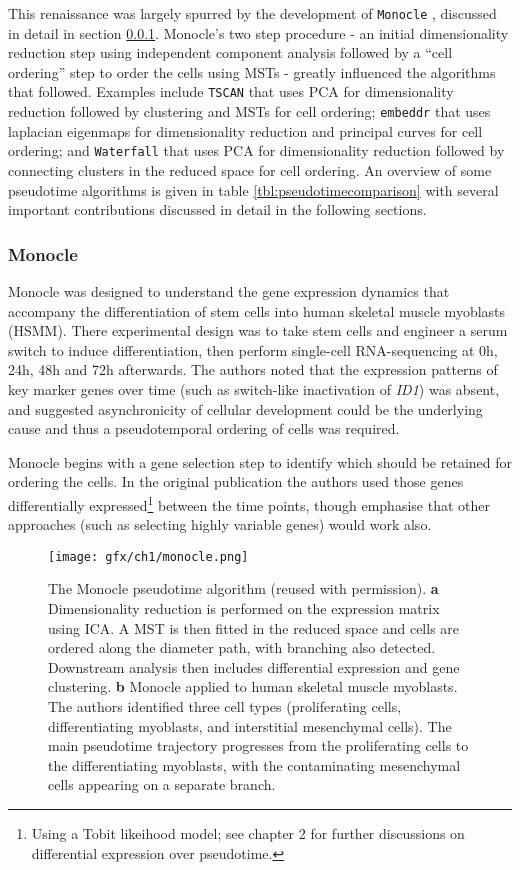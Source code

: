 This renaissance was largely spurred by the development of \texttt{Monocle} \cite{trapnell2014dynamics}, discussed in detail in section \ref{tbl:monocle}. Monocle's two step procedure - an initial dimensionality reduction step using independent component analysis followed by a ``cell ordering'' step to order the cells using MSTs - greatly influenced the algorithms that followed. Examples include \texttt{TSCAN} that uses PCA for dimensionality reduction followed by clustering and MSTs for cell ordering; \texttt{embeddr} that uses laplacian eigenmaps for dimensionality reduction and principal curves for cell ordering; and \texttt{Waterfall} that uses PCA for dimensionality reduction followed by connecting clusters in the reduced space for cell ordering. An overview of some pseudotime algorithms is given in table \ref{tbl:pseudotimecomparison} with several important contributions discussed in detail in the following sections.

\subsubsection{Monocle} \label{tbl:monocle}

Monocle was designed to understand the gene expression dynamics that accompany the differentiation of stem cells into human skeletal muscle myoblasts (HSMM). There experimental design was to take stem cells and engineer a serum switch to induce differentiation, then perform single-cell RNA-sequencing at 0h, 24h, 48h and 72h afterwards. The authors noted that the expression patterns of key marker genes over time (such as switch-like inactivation of \emph{ID1}) was absent, and suggested asynchronicity of cellular development could be the underlying cause and thus a pseudotemporal ordering of cells was required.

Monocle begins with a gene selection step to identify which should be retained for ordering the cells. In the original publication the authors used those genes differentially expressed\footnote{
Using a Tobit likeihood model; see chapter 2 for further discussions on differential expression over pseudotime.
} between the time points, though emphasise that other approaches (such as selecting highly variable genes) would work also.

\begin{figure}
\centering
  \texttt{[image: gfx/ch1/monocle.png]}
  \caption{The Monocle pseudotime algorithm (reused with permission).
\textbf{a} Dimensionality reduction is performed on the expression matrix using ICA. A MST is then fitted in the reduced space and cells are ordered along the diameter path, with branching also detected. Downstream analysis then includes differential expression and gene clustering.
\textbf{b} Monocle applied to human skeletal muscle myoblasts. The authors identified three cell types (proliferating cells, differentiating myoblasts, and interstitial mesenchymal cells). The main pseudotime trajectory progresses from the proliferating cells to the differentiating myoblasts, with the contaminating mesenchymal cells appearing on a separate branch.
  } \label{fig:monocle}
\end{figure}

